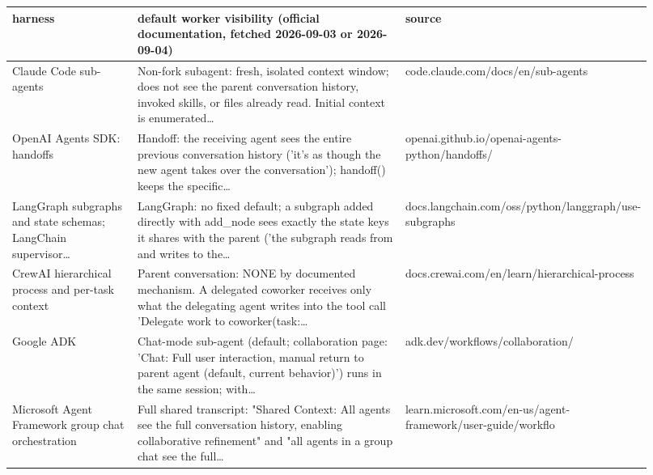 \begin{longtable}{p{0.22\linewidth}p{0.5\linewidth}p{0.2\linewidth}}
\toprule
harness & default worker visibility (official documentation, fetched 2026-09-03 or 2026-09-04) & source \\
\midrule
\endhead
Claude Code sub-\allowbreak{}agents & Non-\allowbreak{}fork subagent: fresh, isolated context window; does not see the parent conversation history, invoked skills, or files already read.\allowbreak{} Initial context is enumerated\ldots & code.\allowbreak{}claude.\allowbreak{}com/\allowbreak{}docs/\allowbreak{}en/\allowbreak{}sub-\allowbreak{}agents \\
OpenAI Agents SDK: handoffs & Handoff: the receiving agent sees the entire previous conversation history ('it's as though the new agent takes over the conversation'); handoff() keeps the specific\ldots & openai.\allowbreak{}github.\allowbreak{}io/\allowbreak{}openai-\allowbreak{}agents-\allowbreak{}python/\allowbreak{}handoffs/\allowbreak{} \\
LangGraph subgraphs and state schemas; LangChain supervisor\ldots & LangGraph: no fixed default; a subgraph added directly with add\_\allowbreak{}node sees exactly the state keys it shares with the parent ('the subgraph reads from and writes to the\ldots & docs.\allowbreak{}langchain.\allowbreak{}com/\allowbreak{}oss/\allowbreak{}python/\allowbreak{}langgraph/\allowbreak{}use-\allowbreak{}subgraphs \\
CrewAI hierarchical process and per-\allowbreak{}task context & Parent conversation: NONE by documented mechanism.\allowbreak{} A delegated coworker receives only what the delegating agent writes into the tool call 'Delegate work to coworker(task:\ldots & docs.\allowbreak{}crewai.\allowbreak{}com/\allowbreak{}en/\allowbreak{}learn/\allowbreak{}hierarchical-\allowbreak{}process \\
Google ADK & Chat-\allowbreak{}mode sub-\allowbreak{}agent (default; collaboratio\allowbreak{}n page: 'Chat: Full user interaction, manual return to parent agent (default, current behavior)') runs in the same session; with\ldots & adk.\allowbreak{}dev/\allowbreak{}workflows/\allowbreak{}collaboratio\allowbreak{}n/\allowbreak{} \\
Microsoft Agent Framework group chat orchestratio\allowbreak{}n & Full shared transcript: "Shared Context: All agents see the full conversation history, enabling collaborativ\allowbreak{}e refinement" and "all agents in a group chat see the full\ldots & learn.\allowbreak{}microsoft.\allowbreak{}com/\allowbreak{}en-\allowbreak{}us/\allowbreak{}agent-\allowbreak{}framework/\allowbreak{}user-\allowbreak{}guide/\allowbreak{}workflo \\

\end{longtable}
